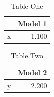 \begin{table}[!htbp]
\centering
\caption{Table One}
\begin{tabular}{lr}
\toprule
 & Model 1 \\
\midrule
x & 1.100 \\
\bottomrule
\end{tabular}
\end{table}

\begin{table}[!htbp]
\centering
\caption{Table Two}
\begin{tabular}{lr}
\toprule
 & Model 2 \\
\midrule
y & 2.200 \\
\bottomrule
\end{tabular}
\end{table}


